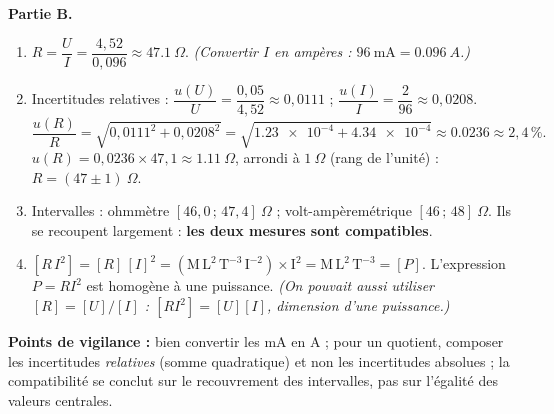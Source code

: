 \documentclass[11pt]{article}
\begin{document}
\begin{corrige}
\textbf{Partie B.}
\begin{enumerate}[resume]
    \item $R = \dfrac{U}{I} = \dfrac{4,52}{0,096} \approx \boxed{\num{47,1}~\Omega}$. \emph{(Convertir $I$ en ampères : $96~\text{mA} = \SI{0,096}{A}$.)}
    \item Incertitudes relatives : $\dfrac{u(U)}{U} = \dfrac{0,05}{4,52} \approx 0,0111$ ; $\dfrac{u(I)}{I} = \dfrac{2}{96} \approx 0,0208$.
    \[ \dfrac{u(R)}{R} = \sqrt{0,0111^2 + 0,0208^2} = \sqrt{\num{1,23e-4} + \num{4,34e-4}} \approx \num{0,0236} \approx 2,4\,\%. \]
    $u(R) = 0,0236 \times 47,1 \approx \SI{1,11}{\Omega}$, arrondi à $\SI{1}{\Omega}$ (rang de l'unité) : $\boxed{R = (\num{47} \pm \num{1})~\Omega}$.
    \item Intervalles : ohmmètre $[46,0\,;\,47,4]~\Omega$ ; volt-ampèremétrique $[46\,;\,48]~\Omega$. Ils se recoupent largement : \textbf{les deux mesures sont compatibles}.
    \item $[R\,I^2] = [R]\,[I]^2 = \left(\text{M}\,\text{L}^2\,\text{T}^{-3}\,\text{I}^{-2}\right)\times\text{I}^2 = \text{M}\,\text{L}^2\,\text{T}^{-3} = [P]$. L'expression $P = RI^2$ est homogène à une puissance. \emph{(On pouvait aussi utiliser $[R] = [U]/[I]$ : $[RI^2] = [U][I]$, dimension d'une puissance.)}
\end{enumerate}
\textbf{Points de vigilance :} bien convertir les mA en A ; pour un quotient, composer les incertitudes \emph{relatives} (somme quadratique) et non les incertitudes absolues ; la compatibilité se conclut sur le recouvrement des intervalles, pas sur l'égalité des valeurs centrales.
\end{corrige}
\end{document}
